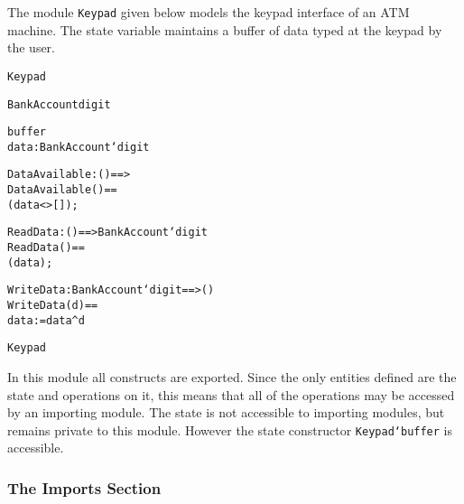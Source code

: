 \documentclass[\pformat,12pt]{article}
\begin{document}
\begin{description}
The module \texttt{Keypad} given below models the keypad interface of
an ATM machine. The state variable maintains a buffer of data typed at
the keypad by the user.

\begin{alltt}
 Keypad

     BankAccount  digit



   buffer 
    data :  BankAccount`digit


    DataAvailable : () ==> 
    DataAvailable () ==
      (data <> []);

    ReadData : () ==>  BankAccount`digit
    ReadData () ==
      (data);

    WriteData :  BankAccount`digit ==> ()
    WriteData (d) ==
      data := data^d

 Keypad
\end{alltt}
In this module all constructs are exported. Since the only entities
defined are the state and operations on it, this means that all of the
operations may be accessed by an importing module. The state is not
accessible to importing modules, but remains private to this
module. However the state constructor
\texttt{Keypad`buffer} is accessible.


\end{description}

\subsubsection{The Imports Section}
\end{document}
